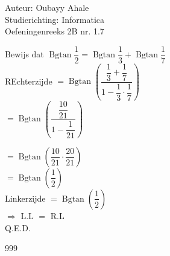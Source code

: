 \documentclass[a4paper]{article}
\begin{document}
  
\noindent \large Auteur: Oubayy Ahale          \\
\noindent \large Studierichting: Informatica   \\
\noindent \large Oefeningenreeks 2B nr. 1.7    \\

\medskip

\normalsize

Bewijs dat $ \operatorname{Bgtan} \dfrac{1}{2} = \operatorname{Bgtan} \dfrac{1}{3} + \operatorname{Bgtan} \dfrac{1}{7} $\\

REchterzijde $ = \operatorname{Bgtan}\left(\dfrac{\dfrac{1}{3} + \dfrac{1}{7}}{1 - \dfrac{1}{3} \cdot \dfrac{1}{7}}\right) $\\

$ = \operatorname{Bgtan} \left(\dfrac{\dfrac{10}{21}}{1 - \dfrac{1}{21}}\right) $\\

\medskip

$ = \operatorname{Bgtan} \left( \dfrac{10}{21} \cdot \dfrac{20}{21} \right) $\\

$ = \operatorname{Bgtan} \left(\dfrac{1}{2}\right) $\\

Linkerzijde $ = \operatorname{Bgtan} \left(\dfrac{1}{2}\right) $\\

$ \Rightarrow $ L.L $=$ R.L \\

Q.E.D.

\begin{thebibliography}{999}
\end{thebibliography}
\end{document}

